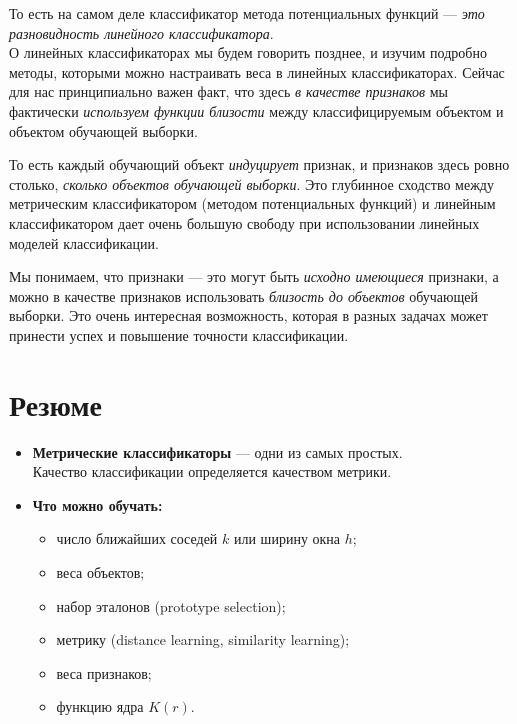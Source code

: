\documentclass{article}
\begin{document}
То есть на самом деле классификатор метода потенциальных функций --- \textit{это разновидность линейного классификатора}. 
\\

О линейных классификаторах мы будем говорить позднее, и изучим подробно методы, которыми можно настраивать веса в линейных классификаторах. Сейчас для нас принципиально важен факт, что здесь \textit{в качестве признаков} мы фактически \textit{используем функции близости} между классифицируемым объектом и объектом обучающей выборки. 

То есть каждый обучающий объект \textit{индуцирует} признак, и признаков здесь ровно столько, \textit{сколько объектов обучающей выборки}. Это глубинное сходство между метрическим классификатором (методом потенциальных функций) и линейным классификатором дает очень большую свободу при использовании линейных моделей классификации. 

Мы понимаем, что признаки --- это могут быть \textit{исходно имеющиеся} признаки, а можно в качестве признаков использовать \textit{близость до объектов} обучающей выборки. Это очень интересная возможность, которая в разных задачах может принести успех и повышение точности классификации.

\newpage
\section{Резюме}

\begin{itemize}
\item \textbf{Метрические классификаторы} --- одни из самых простых.\\
Качество классификации определяется качеством метрики.

\item \textbf{Что можно обучать:}
\begin{itemize}
\item число ближайших соседей $k$ или ширину окна $h$;
\item веса объектов;
\item набор эталонов (prototype selection);
\item метрику (distance learning, similarity learning);
\item веса признаков;
\item функцию ядра $K(r)$.
\end{itemize}
\end{itemize}
\end{document}
